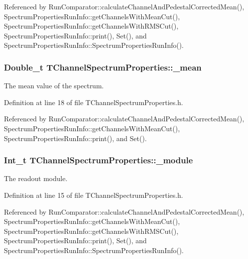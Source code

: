 Referenced by Run\-Comparator\-::calculate\-Channel\-And\-Pedestal\-Corrected\-Mean(), Spectrum\-Properties\-Run\-Info\-::get\-Channels\-With\-Mean\-Cut(), Spectrum\-Properties\-Run\-Info\-::get\-Channels\-With\-R\-M\-S\-Cut(), Spectrum\-Properties\-Run\-Info\-::print(), Set(), and Spectrum\-Properties\-Run\-Info\-::\-Spectrum\-Properties\-Run\-Info().

\hypertarget{class_t_channel_spectrum_properties_a480a137b650eda8d36fb633de95259d1}{
\subsubsection[{\-\_\-mean}]{\setlength{\rightskip}{0pt plus 5cm}Double\-\_\-t T\-Channel\-Spectrum\-Properties\-::\-\_\-mean}}\label{class_t_channel_spectrum_properties_a480a137b650eda8d36fb633de95259d1}


The mean value of the spectrum. 



Definition at line 18 of file T\-Channel\-Spectrum\-Properties.\-h.



Referenced by Run\-Comparator\-::calculate\-Channel\-And\-Pedestal\-Corrected\-Mean(), Spectrum\-Properties\-Run\-Info\-::get\-Channels\-With\-Mean\-Cut(), Spectrum\-Properties\-Run\-Info\-::print(), and Set().

\hypertarget{class_t_channel_spectrum_properties_ae3cf44950a58087f83b1660648750619}{
\subsubsection[{\-\_\-module}]{\setlength{\rightskip}{0pt plus 5cm}Int\-\_\-t T\-Channel\-Spectrum\-Properties\-::\-\_\-module}}\label{class_t_channel_spectrum_properties_ae3cf44950a58087f83b1660648750619}


The readout module. 



Definition at line 15 of file T\-Channel\-Spectrum\-Properties.\-h.



Referenced by Run\-Comparator\-::calculate\-Channel\-And\-Pedestal\-Corrected\-Mean(), Spectrum\-Properties\-Run\-Info\-::get\-Channels\-With\-Mean\-Cut(), Spectrum\-Properties\-Run\-Info\-::get\-Channels\-With\-R\-M\-S\-Cut(), Spectrum\-Properties\-Run\-Info\-::print(), Set(), and Spectrum\-Properties\-Run\-Info\-::\-Spectrum\-Properties\-Run\-Info().

